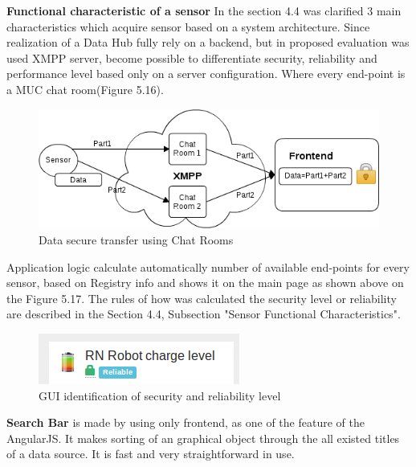 \textbf{Functional characteristic of a sensor}
\newline
In the section 4.4 was clarified 3 main characteristics which acquire sensor based on a system architecture. Since realization of a Data Hub fully rely on a backend, but in proposed evaluation was used XMPP server, become possible to differentiate security, reliability and performance level based only on a server configuration. Where every end-point is a MUC chat room(Figure 5.16). 
\begin{figure}[!ht]
\centering
\includegraphics[scale=0.6]{images/security.png}   
\caption[Security]{Data secure transfer using Chat Rooms}                         
\end{figure}
Application logic calculate automatically number of available end-points for every sensor, based on Registry info and shows it on the main page as shown above on the Figure 5.17. The rules of how was calculated the security level or reliability are described in the Section 4.4, Subsection "Sensor Functional Characteristics".
\newline
\begin{figure}[!ht]
\centering
\includegraphics[scale=1.0]{Screenshots/Icons.png}   
\caption[GUI identification of security and reliability level]{GUI identification of security and reliability level}    
\end{figure}

\textbf{Search Bar} is made by using only frontend, as one of the feature of the AngularJS. It makes sorting of an graphical object through the all existed titles of a data source. It is fast and very straightforward in use. 

